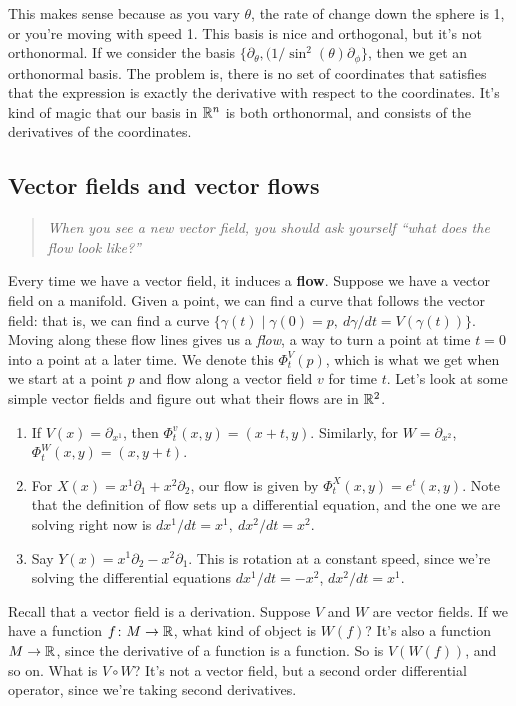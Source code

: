 This makes sense because as you vary $\theta$, the rate of change down the sphere is 1, or you're moving with speed 1. This basis is nice and orthogonal, but it's not orthonormal. If we consider the basis $\{\partial _{\theta}, (1 /\sin ^2(\theta) \partial _{\phi}\} $, then we get an orthonormal basis. The problem is, there is no set of coordinates that satisfies that the expression is exactly the derivative with respect to the coordinates. It's kind of magic that our basis in $\mathbb{R}^n $ is both orthonormal, and consists of the derivatives of the coordinates.

\subsection{Vector fields and vector flows}
\begin{quote}
    \emph{When you see a new vector field, you should ask yourself ``what does the flow look like?''} 
\end{quote}
Every time we have a vector field, it induces a \textbf{flow}. Suppose we have a vector field on a manifold. Given a point, we can find a curve that follows the vector field: that is, we can find a curve $\{\gamma (t)\mid \gamma (0)=p, \ d\gamma /dt=V(\gamma (t))\} $. Moving along these flow lines gives us a \emph{flow}, a way to turn a point at time $t=0$ into a point at a later time. We denote this $\Phi_t^V(p)$, which is what we get when we start at a point $p$ and flow along a vector field $v$ for time $t$. Let's look at some simple vector fields and figure out what their flows are in $\mathbb{R}^2$. 
\begin{enumerate}[label=(\roman*)]
    \item If $V(x)=\partial _{x^1}$, then $\Phi_t^v(x,y)=(x+t,y)$. Similarly, for $W=\partial _{x^2}$, $\Phi_t^W(x,y)=(x,y+t)$.
    \item For $X(x)=x^1\partial_1+x^2\partial_2  $, our flow is given by $\Phi^X_t(x,y)=e^t(x,y)$. Note that the definition of flow sets up a differential equation, and the one we are solving right now is $dx^1/ dt=x^1,\ dx^2 /dt=x^2$.
    \item Say $Y(x)=x^1\partial_2-x^2\partial_1 $. This is rotation at a constant speed, since we're solving the differential equations $dx^1 /dt=-x^2$, $dx^2 /dt=x^1$. 
\end{enumerate}
Recall that a vector field is a derivation. Suppose $V$ and $W$ are vector fields. If we have a function $f \colon M \to \mathbb{R}$, what kind of object is $W(f)$? It's also a function $M\to \mathbb{R}$, since the derivative of a function is a function. So is $V(W(f))$, and so on. What is $V \circ W$? It's not a vector field, but a second order differential operator, since we're taking second derivatives. 

